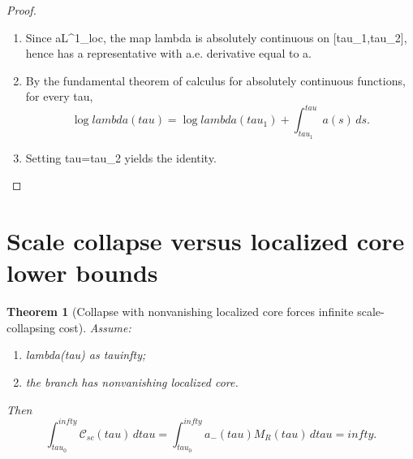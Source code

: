\documentclass[11pt]{amsart}
\def\({}%
\def\){}%
\def\mathrm#1{#1}%
\def\tau{tau}%
\def\lambda{lambda}%
\def\infty{infty}%
\theoremstyle{plain}
\newtheorem{theorem}{Theorem}[section]
\theoremstyle{definition}
\theoremstyle{remark}
\begin{document}
\begin{proof}
\begin{enumerate}[label=(\arabic*)]
  \item Since \(a\in L^1_{\mathrm{loc}}\), the map
  \(\log\lambda\) is absolutely continuous on \([\tau_1,\tau_2]\), hence has a
  representative with a.e. derivative equal to \(a\).

  \item By the fundamental theorem of calculus for absolutely continuous functions,
  for every \(\tau\in[\tau_1,\tau_2]\),
  \[
    \log\lambda(\tau)=\log\lambda(\tau_1)+\int_{\tau_1}^{\tau}a(s)
    \,ds.
  \]

  \item Setting \(\tau=\tau_2\) yields the identity.
\end{enumerate}
\end{proof}

\section{Scale collapse versus localized core lower bounds}

\begin{theorem}[Collapse with nonvanishing localized core forces infinite
scale-collapsing cost]\label{thm:collapse-core-floor}
Assume:
\begin{enumerate}[label=(\arabic*)]
  \item \(\lambda(\tau)\) as \(\tau\to\infty\);
  \item the branch has nonvanishing localized core.
\end{enumerate}
Then
\[
  \int_{\tau_0}^{\infty}\mathcal C_{\mathrm{sc}}(\tau)
  \,d\tau
  =\int_{\tau_0}^{\infty}a_-(\tau)M_R(\tau)
  \,d\tau=\infty.
\]
\end{theorem}
\end{document}
